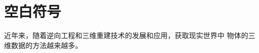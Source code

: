 \documentclass[fontset = windows]{ctexbook}
\begin{document}
    \section{空白符号}
    近年来，随着逆向工程和三维重建技术的发展和应用，获取现实世界中
    物体的三维数据的方法越来越多。
\end{document}
